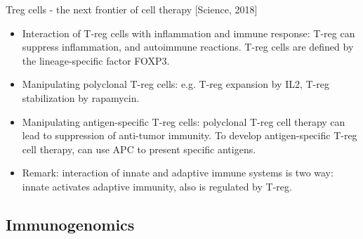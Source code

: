\documentclass{report}
\begin{document}
Treg cells - the next frontier of cell therapy [Science, 2018]
\begin{itemize}
	\item Interaction of T-reg cells with inflammation and immune response: T-reg can suppress inflammation, and autoimmune reactions. T-reg cells are defined by the lineage-specific factor FOXP3.
	
	\item Manipulating polyclonal T-reg cells: e.g. T-reg expansion by IL2, T-reg stabilization by rapamycin.
	
	\item Manipulating antigen-specific T-reg cells: polyclonal T-reg cell therapy can lead to suppression of anti-tumor immunity. To develop antigen-specific T-reg cell therapy, can use APC to present specific antigens.
	
	\item Remark: interaction of innate and adaptive immune systems is two way: innate activates adaptive immunity, also is regulated by T-reg.
\end{itemize}
\subsection{Immunogenomics}
\end{document}
